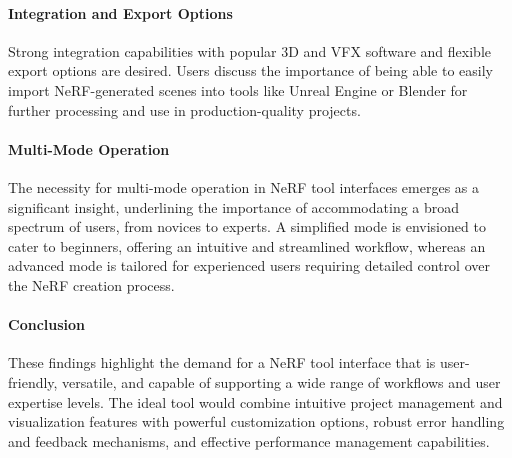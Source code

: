 

\paragraph{Integration and Export Options}

Strong integration capabilities with popular 3D and VFX software and flexible export options are desired. 
Users discuss the importance of being able to easily import NeRF-generated scenes into tools like Unreal Engine or Blender for further processing and use in production-quality projects​​.

\paragraph{Multi-Mode Operation}

The necessity for multi-mode operation in NeRF tool interfaces emerges as a significant insight, underlining the importance of accommodating a broad spectrum of users, from novices to experts. 
A simplified mode is envisioned to cater to beginners, offering an intuitive and streamlined workflow, whereas an advanced mode is tailored for experienced users requiring detailed control over the NeRF creation process. 

\paragraph{Conclusion}

These findings highlight the demand for a NeRF tool interface that is user-friendly, versatile, and capable of supporting a wide range of workflows and user expertise levels. 
The ideal tool would combine intuitive project management and visualization features with powerful customization options, robust error handling and feedback mechanisms, and effective performance management capabilities.

